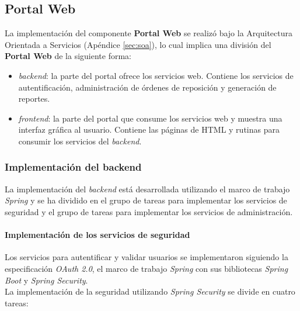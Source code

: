 \subsection{Portal Web}\label{sec:web-portal}
La implementación del componente \textbf{Portal Web} se realizó bajo la Arquitectura Orientada a Servicios (Apéndice \ref{sec:soa}), lo cual implica una división del \textbf{Portal Web} de la siguiente forma:
\begin{itemize}
	\item \textit{backend}: la parte del portal ofrece los servicios web. Contiene los servicios de autentificación, administración de órdenes de reposición y generación de reportes.
	\item \textit{frontend}: la parte del portal que consume los servicios web y muestra una interfaz gráfica al usuario. Contiene las páginas de HTML y rutinas para consumir los servicios del \textit{backend}.
\end{itemize}

\subsubsection{Implementación del backend}\label{sec:backend}
La implementación del \textit{backend} está desarrollada utilizando el marco de trabajo \textit{Spring} y se ha dividido en el grupo de tareas para implementar los servicios de seguridad y el grupo de tareas para implementar los servicios de administración.

\paragraph{Implementación de los servicios de seguridad\\}
Los servicios para autentificar y validar usuarios se implementaron siguiendo la especificación \textit{OAuth 2.0}, el marco de trabajo \textit{Spring} con sus bibliotecas \textit{Spring Boot} y \textit{Spring Security}.\\
La implementación de la seguridad utilizando \textit{Spring Security} se divide en cuatro tareas:


